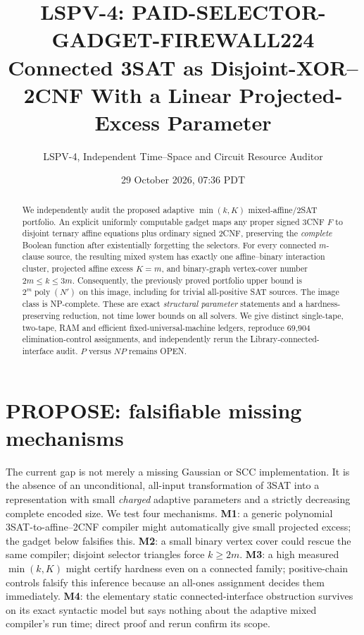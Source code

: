 \documentclass[11pt]{article}
\title{LSPV-4: PAID-SELECTOR-GADGET-FIREWALL224\\[3pt]
\large Connected 3SAT as Disjoint-XOR--2CNF With a Linear Projected-Excess Parameter}
\author{LSPV-4, Independent Time--Space and Circuit Resource Auditor}
\date{29 October 2026, 07:36 PDT}
\newcommand{\poly}{\operatorname{poly}}
\begin{document}
\maketitle
\begin{abstract}
We independently audit the proposed adaptive $\min(k,K)$ mixed-affine/2SAT portfolio. An explicit uniformly computable gadget maps any proper signed 3CNF $F$ to disjoint ternary affine equations plus ordinary signed 2CNF, preserving the \emph{complete} Boolean function after existentially forgetting the selectors. For every connected $m$-clause source, the resulting mixed system has exactly one affine--binary interaction cluster, projected affine excess $K=m$, and binary-graph vertex-cover number $2m\le k\le3m$. Consequently, the previously proved portfolio upper bound is $2^m\poly(N')$ on this image, including for trivial all-positive SAT sources. The image class is NP-complete. These are exact \emph{structural parameter} statements and a hardness-preserving reduction, not time lower bounds on all solvers. We give distinct single-tape, two-tape, RAM and efficient fixed-universal-machine ledgers, reproduce 69,904 elimination-control assignments, and independently rerun the Library-connected-interface audit. $P$ versus $NP$ remains OPEN.
\end{abstract}

\section{PROPOSE: falsifiable missing mechanisms}
The current gap is not merely a missing Gaussian or SCC implementation. It is the absence of an unconditional, all-input transformation of 3SAT into a representation with small \emph{charged} adaptive parameters and a strictly decreasing complete encoded size. We test four mechanisms. \textbf{M1}: a generic polynomial 3SAT-to-affine--2CNF compiler might automatically give small projected excess; the gadget below falsifies this. \textbf{M2}: a small binary vertex cover could rescue the same compiler; disjoint selector triangles force $k\ge2m$. \textbf{M3}: a high measured $\min(k,K)$ might certify hardness even on a connected family; positive-chain controls falsify this inference because an all-ones assignment decides them immediately. \textbf{M4}: the elementary static connected-interface obstruction survives on its exact syntactic model but says nothing about the adaptive mixed compiler's run time; direct proof and rerun confirm its scope.
\end{document}

